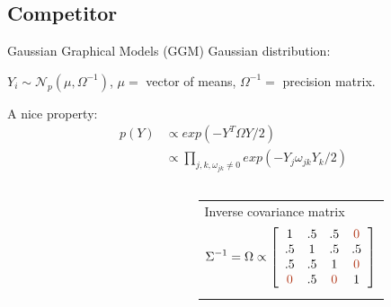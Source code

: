 \documentclass[9pt]{beamer}
\newcommand{\edgeunit}{1.5}
\newcommand{\emphase}[1]{\textcolor{Complement}{#1}}
\newcommand{\Ncal}{\mathcal{N}}
\begin{document}
\subsection{Competitor}

\begin{frame}{Gaussian Graphical Models (GGM) }
   \emphase{Gaussian distribution:}\\
 \begin{center}
	$  Y_i \sim \Ncal_p(\mu, \Omega^{-1}) $, $\mu =$ vector of means, $\Omega^{-1} =$ precision matrix.

\end{center}
  
 
  
   \bigskip %
  \emphase{A nice property:} 
\begin{align*}
p(Y) &\propto exp(-Y^T \Omega Y /2)\\
&\propto \prod_{j,k, \omega_{jk} \neq 0 } exp(-Y_j \omega_{jk} Y_k /2)  
\end{align*}
  \begin{columns}
  \begin{column}{0.15\textwidth}
	
\end{column}
  \begin{column}{0.4\textwidth}
    \end{column}
    \begin{column}{8cm}
 
    \begin{tabular}{p{}}
	 Inverse covariance matrix
	 $$
	 \Sigma^{-1} = \Omega \propto \left[ \begin{array}{cccc}
	   1 & .5 & .5 & \emphase{0} \\
	   .5 & 1 & .5 & .5 \\
	   .5 & .5 & 1 & \emphase{0} \\
	   \emphase{0} & .5& \emphase{0}  & 1
	   \end{array} \right] 
	 $$
    \end{tabular} 
   
  \end{column}
  \end{columns}

\end{frame}
\end{document}
